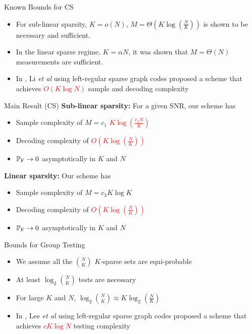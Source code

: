 \documentclass[final]{beamer}
\newlength{\onecolwid}
\newlength{\blockskip}
\newlength{\paraskip}
\begin{document}
\begin{frame}
\begin{columns}[t]
\begin{column}{\onecolwid}
 
    \begin{block}{\Large Known Bounds for CS}
	\begin{itemize}
	 \item For sub-linear sparsity, $K=o(N)$, $M=\Theta\left( K\log(\frac{N}{K	})\right)$ is shown to be necessary and sufficient.
	  \item In the linear sparse regime, $K=\alpha N$, it was shown that $M=\Theta(N)$ measurements are sufficient. 
	  \item In \cite{li2015subisit}, Li \textit{et al} using left-regular sparse graph codes proposed a scheme that achieves \textcolor{red}{$O(K\log N)$} sample and decoding complexity
	 \end{itemize}
	 
   \begin{alertblock}{\Large Main Result (CS)} 
	    \textbf{Sub-linear sparsity: }For a given SNR, our scheme has 
			\begin{itemize}
			\itemsep10pt
				\item Sample complexity of $M=c_1$ \textcolor{red}{$K\log (\frac{c_2 N}{K})$}
				\item Decoding complexity of \textcolor{red}{$O\left(K\log(\frac{N}{K})\right)$} 
				\item $\mathbb{P}_{\text{F}}\rightarrow 0$ asymptotically in $K$ and $N$
			\end{itemize} 
\vspace{\paraskip}    
  
   \textbf{Linear sparsity: }Our scheme has 
		\begin{itemize}
		\itemsep10pt
			\item Sample complexity of $M=c_3 K\log K$
			\item Decoding complexity of \textcolor{red}{$O\left(K\log(\frac{N}{K})\right)$}
			\item $\mathbb{P}_{\text{F}}\rightarrow 0$ asymptotically in $K$ and $N$
		\end{itemize} 
    \end{alertblock}
 \end{block}
  \vspace{\blockskip}   
    
    \begin{block}{\Large Bounds for Group Testing}
		\begin{itemize}
			 \item We assume all the $\binom{N}{K}$ $K$-sparse sets are equi-probable
			 \item At least $\log_2 \binom{N}{K}$ tests are necessary
			 \item For large $K$ and $N$, $\log_2 \binom{N}{K}\approx K\log_2(\frac{N}{K})$
	 	  \item In \cite{lee2015saffron}, Lee \textit{et al} using left-regular sparse graph codes proposed a scheme that achieves \textcolor{red}{$cK\log N$} testing complexity
	 \end{itemize}
	 

\end{block}
\end{column}
\end{columns}
\end{frame}
\end{document}

